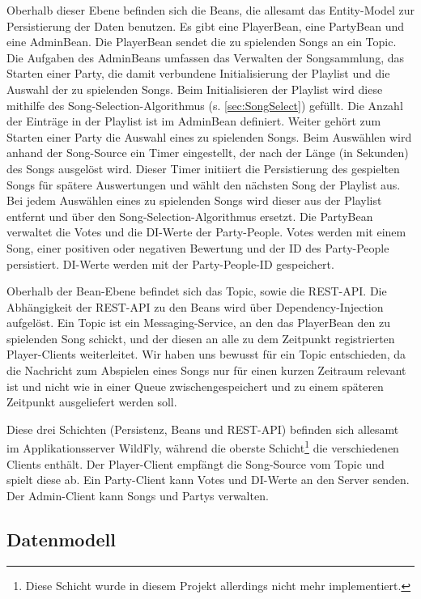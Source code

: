 Oberhalb dieser Ebene befinden sich die Beans, die allesamt das Entity-Model zur Persistierung der Daten benutzen. Es gibt eine PlayerBean, eine PartyBean und eine AdminBean.
Die PlayerBean sendet die zu spielenden Songs an ein Topic.
Die Aufgaben des AdminBeans umfassen das Verwalten der Songsammlung, das Starten einer Party, die damit verbundene Initialisierung der Playlist und die Auswahl der zu spielenden Songs. Beim Initialisieren der Playlist wird diese mithilfe des Song-Selection-Algorithmus (s. \ref{sec:SongSelect}) gefüllt. Die Anzahl der Einträge in der Playlist ist im AdminBean definiert. Weiter gehört zum Starten einer Party die Auswahl eines zu spielenden Songs. Beim Auswählen wird anhand der Song-Source ein Timer eingestellt, der nach der Länge (in Sekunden) des Songs ausgelöst wird. Dieser Timer initiiert die Persistierung des gespielten Songs für spätere Auswertungen und wählt den nächsten Song der Playlist aus. Bei jedem Auswählen eines zu spielenden Songs wird dieser aus der Playlist entfernt und über den Song-Selection-Algorithmus ersetzt.
Die PartyBean verwaltet die Votes und die DI-Werte der Party-People. Votes werden mit einem Song, einer positiven oder negativen Bewertung und der ID des Party-People persistiert. DI-Werte werden mit der Party-People-ID gespeichert.

Oberhalb der Bean-Ebene befindet sich das Topic, sowie die REST-API. Die Abhängigkeit der REST-API zu den Beans wird über Dependency-Injection aufgelöst. Ein Topic ist ein Messaging-Service, an den das PlayerBean den zu spielenden Song schickt, und der diesen an alle zu dem Zeitpunkt registrierten Player-Clients weiterleitet. Wir haben uns bewusst für ein Topic entschieden, da die Nachricht zum Abspielen eines Songs nur für einen kurzen Zeitraum relevant ist und nicht wie in einer Queue zwischengespeichert und zu einem späteren Zeitpunkt ausgeliefert werden soll.

Diese drei Schichten (Persistenz, Beans und REST-API) befinden sich allesamt im Applikationsserver WildFly, während die oberste Schicht\footnote{Diese Schicht wurde in diesem Projekt allerdings nicht mehr implementiert.} die verschiedenen Clients enthält. Der Player-Client empfängt die Song-Source vom Topic und spielt diese ab. Ein Party-Client kann Votes und DI-Werte an den Server senden. Der Admin-Client kann Songs und Partys verwalten.

\subsection{Datenmodell}

